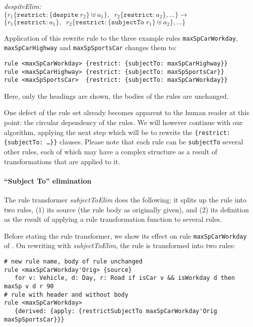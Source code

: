 \noindent
\emph{despiteElim:}\\
$
\{r_1 \{\mathtt{restrict}: \{\mathtt{despite}\; r_2\} \uplus a_1\},\;\;
r_2\{\mathtt{restrict}: a_2\}, \dots\} \longrightarrow$\\
$\{r_1 \{\mathtt{restrict}: a_1\},\;\;
r_2\{\mathtt{restrict}:  \{\mathtt{subjectTo}\; r_1\} \uplus a_2\}, \dots\}
$

\begin{example}\label{ex:rewrite_despite}
Application of this rewrite rule to the three example rules \texttt{maxSpCarWorkday},
\texttt{maxSpCarHighway} and  \texttt{maxSpSportsCar} changes them to:

\begin{lstlisting}[columns=fixed]
rule <maxSpCarWorkday> {restrict: {subjectTo: maxSpCarHighway}}
rule <maxSpCarHighway> {restrict: {subjectTo: maxSpSportsCar}}
rule <maxSpSportsCar>  {restrict: {subjectTo: maxSpCarWorkday}}
\end{lstlisting}
Here, only the headings are shown, the bodies of the rules are
unchanged. 
\end{example}

One defect of the rule set already becomes apparent to the human reader at
this point: the circular dependency of the rules. We will however continue
with our algorithm, applying the next step which will be to rewrite the
\texttt{\{restrict: \{subjectTo: \dots\}\}} clauses.  Please note that each
rule can be \texttt{subjectTo} several other rules, each of which may have a
complex structure as a result of transformations that are applied to it.

\paragraph{\textbf{``Subject To''  elimination}}

The rule transformer \emph{subjectToElim} does the following: it splits up the
rule into two rules, (1) its source (the rule body as originally given), and
(2) its definition as the result of applying a rule transformation function to
several rules.

\begin{example}\label{ex:rewrite_subject_to}
Before stating the rule transformer, we show its effect on rule
\texttt{maxSpCarWorkday} of . On rewriting
with \emph{subjectToElim}, the rule is transformed into two rules:

\begin{lstlisting}
# new rule name, body of rule unchanged
rule <maxSpCarWorkday'Orig> {source}
   for v: Vehicle, d: Day, r: Road if isCar v && isWorkday d then maxSp v d r 90
# rule with header and without body
rule <maxSpCarWorkday>
   {derived: {apply: {restrictSubjectTo maxSpCarWorkday'Orig  maxSpSportsCar}}}
\end{lstlisting}
\end{example}

